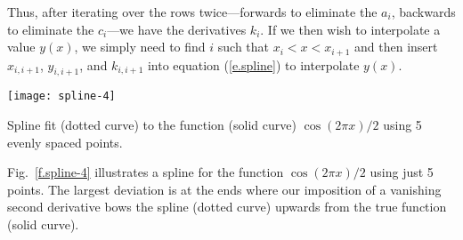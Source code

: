 Thus, after iterating over the rows twice---forwards to eliminate the $a_{i}$, backwards to eliminate the $c_{i}$---we have the derivatives $k_{i}$. If we then wish to interpolate a value $y(x)$, we simply need to find $i$ such that $x_{i}< x < x_{i+1}$ and then insert $x_{i,i+1}$, $y_{i,i+1}$, and $k_{i,i+1}$ into equation (\ref{e.spline}) to interpolate $y(x)$.

\begin{marginfigure}
\texttt{[image: spline-4]}
\caption[Example of a spline fit]{\label{f.spline-4} Spline fit (dotted curve) to the function (solid curve) $\cos(2\pi x)/2$ using 5 evenly spaced points.}
\end{marginfigure}
Fig.~\ref{f.spline-4} illustrates a spline for the function $\cos(2\pi x)/2$ using just 5 points. The largest deviation is at the ends where our imposition of a vanishing second derivative bows the spline (dotted curve) upwards from the true function (solid curve).

